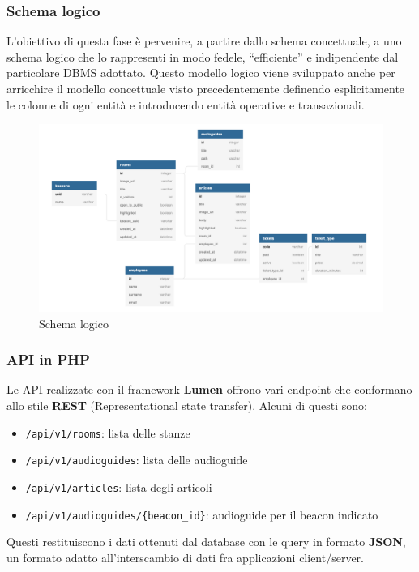 \documentclass[12pt]{article}
\begin{document}
\clearpage

\subsubsection{Schema logico}
L’obiettivo di questa fase è pervenire, a partire dallo schema concettuale, a uno schema logico che
lo rappresenti in modo fedele, “efficiente” e indipendente dal particolare DBMS adottato. Questo modello logico viene sviluppato anche per arricchire il modello concettuale visto precedentemente definendo esplicitamente le colonne di ogni entità e introducendo entità operative e transazionali.

\begin{center}
    \begin{figure}[htp]
        \centering
        \includegraphics[width=\textwidth]{diagrams/logic_scheme.png}
        \caption{Schema logico}
        \label{fig:logic_scheme}
    \end{figure}
\end{center}

\subsubsection{API in PHP}
Le API realizzate con il framework \textbf{Lumen} offrono vari endpoint che conformano allo stile \textbf{REST} (Representational state transfer). Alcuni di questi sono:
\begin{itemize}
    \item \verb+/api/v1/rooms+: lista delle stanze
    \item \verb+/api/v1/audioguides+: lista delle audioguide
    \item \verb+/api/v1/articles+: lista degli articoli
    \item \verb+/api/v1/audioguides/{beacon_id}+: audioguide per il beacon indicato
\end{itemize}
Questi restituiscono i dati ottenuti dal database con le query in formato \textbf{JSON}, un formato adatto all'interscambio di dati fra applicazioni client/server.
\end{document}
